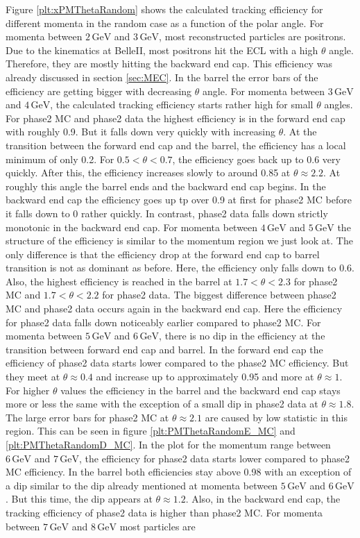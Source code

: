 \documentclass[a4paper,11pt,twosided,final,german,openbib,pdftex,listof=totoc,bibliography=totoc]{scrbook}
\begin{document}
Figure \ref{plt:xPMThetaRandom} shows the calculated tracking efficiency for different momenta in the random case as a function of the polar angle. For momenta between $2\,\textrm{GeV}$ and $3\,\textrm{GeV}$, most reconstructed particles are positrons. Due to the kinematics at BelleII, most positrons hit the ECL with a high $\theta$ angle. Therefore, they are mostly hitting the backward end cap. This efficiency was already discussed in section \ref{sec:MEC}. In the barrel the error bars of the efficiency are getting bigger with decreasing $\theta$ angle. For momenta between $3\,\textrm{GeV}$ and $4\,\textrm{GeV}$, the calculated tracking efficiency starts rather high for small $\theta$ angles. For phase2 MC and phase2 data the highest efficiency is in the forward end cap with roughly 0.9. But it falls down very quickly with increasing $\theta$. At the transition between the forward end cap and the barrel, the efficiency has a local minimum of only 0.2. For $0.5 < \theta < 0.7$, the efficiency goes back up to 0.6 very quickly. After this, the efficiency increases slowly to around 0.85 at $\theta \approx 2.2$. At roughly  this angle the barrel ends and the backward end cap begins. In the backward end cap the efficiency goes up tp over 0.9 at first for phase2 MC before it falls down to 0 rather quickly. In contrast, phase2 data falls down strictly monotonic in the backward end cap. For momenta between $4\,\textrm{GeV}$ and $5\,\textrm{GeV}$ the structure of the efficiency is similar to the momentum region we just look at. The only difference is that the efficiency drop at the forward end cap to barrel transition is not as dominant as before. Here, the efficiency only falls down to 0.6. Also, the highest efficiency is reached in the barrel at $1.7< \theta <2.3$ for phase2 MC and $1.7< \theta <2.2$ for phase2 data. The biggest difference between phase2 MC and phase2 data occurs again in the backward end cap. Here the efficiency for phase2 data falls down noticeably earlier compared to phase2 MC. For momenta between $5\,\textrm{GeV}$ and $6\,\textrm{GeV}$, there is no dip in the efficiency at the transition between forward end cap and barrel. In the forward end cap the efficiency of phase2 data starts lower compared to the phase2 MC efficiency. But they meet at $\theta \approx 0.4$  and increase up to approximately 0.95 and more at $\theta \approx 1$. For higher $\theta$ values the efficiency in the barrel and the backward end cap stays more or less the same with the exception of a small dip in phase2 data at $\theta \approx 1.8$. The large error bars for phase2 MC at $\theta \approx 2.1$ are caused by low statistic in this region. This can be seen in figure \ref{plt:PMThetaRandomE_MC} and \ref{plt:PMThetaRandomD_MC}. In the plot for the momentum range between $6\,\textrm{GeV}$ and $7\,\textrm{GeV}$, the efficiency for phase2 data starts lower compared to phase2 MC efficiency. In the barrel both efficiencies stay above 0.98 with an exception of a dip similar to the dip already mentioned at momenta between $5\,\textrm{GeV}$ and $6\,\textrm{GeV}$. But this time, the dip appears at $\theta \approx 1.2$. Also, in the backward end cap, the tracking efficiency of phase2 data is higher than phase2 MC. For momenta  between $7\,\textrm{GeV}$ and $8\,\textrm{GeV}$ most particles are 
\end{document}
